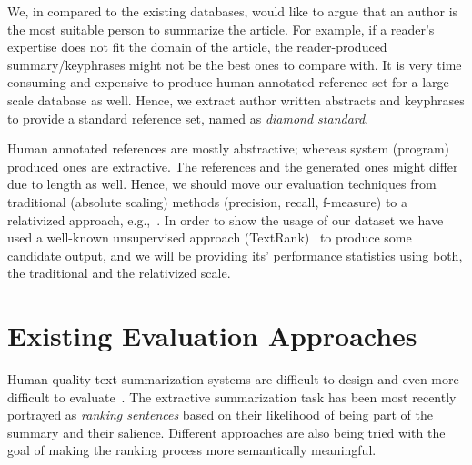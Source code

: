 \documentclass{sig-alternate-05-2015}
\begin{document}
\par We, in compared to the existing databases, would like to argue that an author is the most suitable person to summarize the article. For example, if a reader's expertise does not fit the domain of the article, the reader-produced summary/keyphrases might not be the best ones to compare with. It is very time consuming and expensive to produce human annotated reference set for a large scale database as well. Hence, we extract author written abstracts and keyphrases to provide a standard reference set, named as \emph{diamond standard}. \\
\par Human annotated references are mostly abstractive; whereas system (program) produced ones are extractive. The references and the generated ones might differ due to length as well. Hence, we should move our evaluation techniques from traditional (absolute scaling) methods (precision, recall, f-measure) to a relativized approach, e.g.,~\cite{DBLP:conf/ecir/HamidHT16}. In order to show the usage of our dataset we have used a well-known unsupervised approach (TextRank)~\cite{Mihalcea04TextRank} to produce some candidate output, and we will be providing its' performance statistics using both, the traditional and the relativized scale.
\iffalse
\section{Existing Evaluation Approaches}

\par Human quality text summarization systems are difficult to design and even more difficult to evaluate~\cite{Goldstein:1999:STD:312624.312665}. The extractive summarization task has been most recently portrayed as \emph{ranking sentences} based on their likelihood of being part of the summary and their salience. Different approaches are also being tried with the goal of making the ranking process more semantically meaningful.
\end{document}
